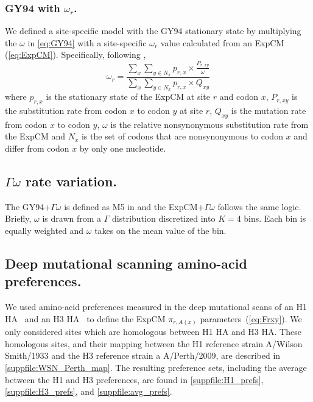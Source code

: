\documentclass[11pt]{article}
\begin{document}
\subsubsection*{GY94 with $\omega_r$.}

We defined a site-specific model with the GY94 stationary state by multiplying the $\omega$ in \ref{eq:GY94} with a site-specific $\omega_r$ value calculated from an ExpCM (\ref{eq:ExpCM}). 
Specifically, following \citet{spielman2015relationship}, 
\begin{equation}
\label{eq:w_r}
\omega_{r} = \frac{\sum_{x} \sum_{y \in N_x} {p_{r,x} \times \frac{P_{r,xy}}{\omega}}}{\sum_{x} \sum_{y \in N_x} {p_{r,x} \times Q_{xy}}}
\end{equation}
where $p_{r,x}$ is the stationary state of the ExpCM at site $r$ and codon $x$, $P_{r,xy}$ is the substitution rate from codon $x$ to codon $y$ at site $r$, $Q_{xy}$ is the mutation rate from codon $x$ to codon $y$, $\omega$ is the relative nonsynonymous substitution rate from the ExpCM and $N_x$ is the set of codons that are nonsynonymous to codon $x$ and differ from codon $x$ by only one nucleotide. 

\subsection*{$\Gamma\omega$ rate variation.}

The GY94+$\Gamma\omega$ is defined as M5 in \citet{yang2000codon} and the ExpCM+$\Gamma\omega$ follows the same logic. 
Briefly, $\omega$ is drawn from a $\Gamma$ distribution discretized into $K=4$ bins. 
Each bin is equally weighted and $\omega$ takes on the mean value of the bin. 

\subsection*{Deep mutational scanning amino-acid preferences.}
We used amino-acid preferences measured in the deep mutational scans of an H1 HA~\citep{doud2016accurate} and an H3 HA~\citep{lee2018deep} to define the ExpCM $\pi_{r, A\left(x\right)}$ parameters~(\ref{eq:Frxy}). 
We only considered sites which are homologous between H1 HA and H3 HA. 
These homologous sites, and their mapping between the H1 reference strain A/Wilson Smith/1933 and the H3 reference strain a A/Perth/2009, are described in \ref{suppfile:WSN_Perth_map}. 
The resulting preference sets, including the average between the H1 and H3 preferences, are found in \ref{suppfile:H1_prefs}, \ref{suppfile:H3_prefs}, and \ref{suppfile:avg_prefs}.
\end{document}
